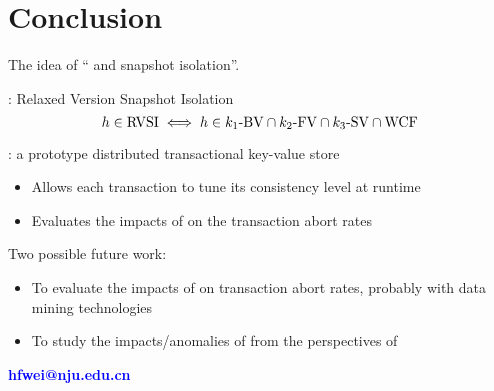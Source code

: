 \section{Conclusion}

\begin{frame}{}
  The idea of {\large `` and  snapshot isolation''}.

  \vspace{0.80cm}
  \blue{\rvsi{}}: Relaxed Version Snapshot Isolation
  \begin{equation*}
    h \in \text{RVSI}{} \iff h \in k_1\text{-BV}{} \cap k_2\text{-FV}{} \cap k_3\text{-SV}{} \cap \text{WCF}{}
  \end{equation*}

  \vspace{0.30cm}
  \red{\chameleon{}}: a prototype distributed transactional key-value store
  \begin{itemize}
    \item Allows each transaction to tune its consistency level at runtime
    \item Evaluates the impacts of \rvsi{} on the transaction abort rates
  \end{itemize}
\end{frame}

\begin{frame}{}
  Two possible future work:
  \begin{itemize}
    \item To evaluate the impacts of \blue{$\kthreesv$} on transaction abort rates,
      probably with data mining technologies
    \item To study the impacts/anomalies of \rvsi{} from the perspectives of 
  \end{itemize}
\end{frame}

\begin{frame}[noframenumbering]
  \vspace{-0.8cm}
  \begin{center}
    \textcolor{blue}{\bf \large hfwei@nju.edu.cn}
  \end{center}
  \vspace{-0.5cm}
\end{frame}
